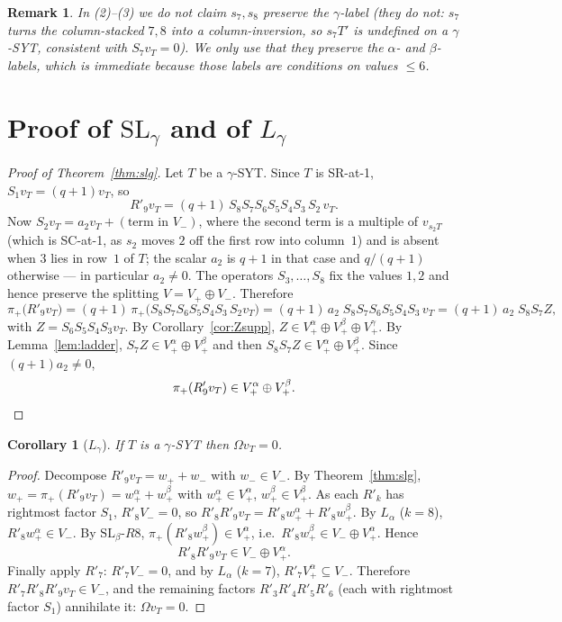 \documentclass[11pt]{article}
\newtheorem{corollary}{Corollary}
\newtheorem*{remark}{Remark}
\newcommand{\Vp}{V_{+}}
\newcommand{\Vm}{V_{-}}
\newcommand{\Va}{V_{+}^{\alpha}}
\newcommand{\Vb}{V_{+}^{\beta}}
\newcommand{\Vg}{V_{+}^{\gamma}}
\begin{document}
\begin{remark}
In (2)--(3) we do \emph{not} claim $s_7,s_8$ preserve the $\gamma$-label
(they do not: $s_7$ turns the column-stacked $7,8$ into a column-inversion, so
$s_7T'$ is undefined on a $\gamma$-SYT, consistent with $S_7v_T=0$). We only
use that they preserve the $\alpha$- and $\beta$-labels, which is immediate
because those labels are conditions on values $\le 6$.
\end{remark}

\section{Proof of $\mathrm{SL}_\gamma$ and of $L_\gamma$}

\begin{proof}[Proof of Theorem~\ref{thm:slg}]
Let $T$ be a $\gamma$-SYT. Since $T$ is SR-at-1, $S_1 v_T=(q+1)v_T$, so
\[
R'_9 v_T = (q+1)\, S_8 S_7 S_6 S_5 S_4 S_3\, S_2\, v_T .
\]
Now $S_2 v_T = a_2 v_T + (\text{term in }\Vm)$, where the second term is a
multiple of $v_{s_2 T}$ (which is SC-at-1, as $s_2$ moves $2$ off the first row
into column~$1$) and is absent when $3$ lies in row~$1$ of $T$; the scalar
$a_2$ is $q+1$ in that case and $q/(q+1)$ otherwise --- in particular
$a_2\neq 0$. The operators $S_3,\dots,S_8$ fix the values $1,2$ and hence
preserve the splitting $V=\Vp\oplus\Vm$. Therefore
\[
\pi_+\big(R'_9 v_T\big)
= (q+1)\,\pi_+\big(S_8S_7S_6S_5S_4S_3\,S_2 v_T\big)
= (q+1)\,a_2\; S_8S_7S_6S_5S_4S_3\, v_T
= (q+1)\,a_2\; S_8 S_7 Z,
\]
with $Z=S_6S_5S_4S_3 v_T$. By Corollary~\ref{cor:Zsupp},
$Z\in\Va\oplus\Vb\oplus\Vg$. By Lemma~\ref{lem:ladder},
$S_7 Z\in\Va\oplus\Vb$ and then $S_8 S_7 Z\in\Va\oplus\Vb$. Since
$(q+1)a_2\neq 0$,
\[
\pi_+(R'_9 v_T)\in\Va\oplus\Vb . \qedhere
\]
\end{proof}

\begin{corollary}[$L_\gamma$]\label{cor:Lgamma}
If $T$ is a $\gamma$-SYT then $\Omega v_T = 0$.
\end{corollary}

\begin{proof}
Decompose $R'_9 v_T = w_+ + w_-$ with $w_-\in\Vm$. By
Theorem~\ref{thm:slg}, $w_+=\pi_+(R'_9v_T)=w_+^\alpha+w_+^\beta$ with
$w_+^\alpha\in\Va$, $w_+^\beta\in\Vb$. As each $R'_k$ has rightmost factor
$S_1$, $R'_8\Vm=0$, so $R'_8R'_9 v_T = R'_8 w_+^\alpha + R'_8 w_+^\beta$. By
$L_\alpha$ ($k=8$), $R'_8 w_+^\alpha\in\Vm$. By $\mathrm{SL}_\beta\text{-}R8$,
$\pi_+(R'_8 w_+^\beta)\in\Va$, i.e.\ $R'_8 w_+^\beta\in \Vm\oplus\Va$. Hence
\[
R'_8R'_9 v_T \in \Vm\oplus\Va .
\]
Finally apply $R'_7$: $R'_7\Vm=0$, and by $L_\alpha$ ($k=7$),
$R'_7\Va\subseteq\Vm$. Therefore $R'_7R'_8R'_9 v_T\in\Vm$, and the remaining
factors $R'_3R'_4R'_5R'_6$ (each with rightmost factor $S_1$) annihilate it:
$\Omega v_T=0$.
\end{proof}
\end{document}
